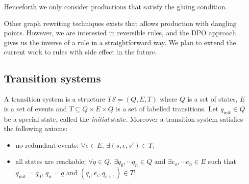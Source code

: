 Henceforth we only consider productions that satisfy the gluing condition.

\begin{remark}
Other graph rewriting techniques exists that allows production with dangling points. However, we are interested in reversible rules, and the DPO approach gives us the inverse of a rule in a straightforward way. We plan to extend the current work to rules with side effect in the future.
\end{remark}

\subsection{Transition systems}

\begin{definition}
  \label{def:ts_nielsen}
  A transition system is a structure $TS = (Q,E,T)$ where $Q$ is a set of states, $E$ is a set of events and $T\subseteq Q\times E\times Q$ is a set of labelled transitions. Let $q_{\text{init}}\in Q$ be a special state, called the \emph{initial} state. Moreover a transition system satisfies the following axioms:
  \begin{itemize}
  \item no redundant events: $\forall e\in E$, $\exists (s,e,s')\in T$;
  \item all states are reachable: $\forall q\in Q$, $\exists q_0,\cdots q_n \in Q$ and $\exists e_o,\cdots e_n\in E$ such that $q_{\text{init}} = q_0$, $q_n =q$ and $(q_i,e_i,q_{i+1}) \in T$;
  \end{itemize}
\end{definition}

